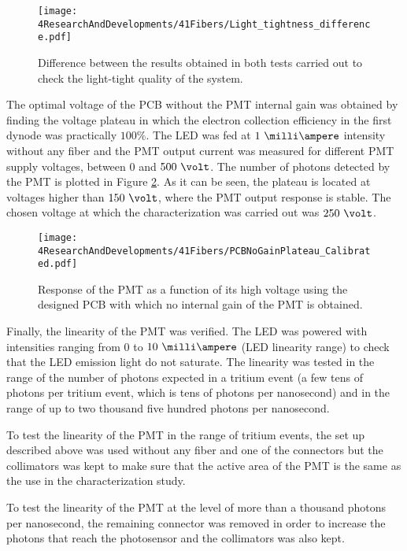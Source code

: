 \begin{figure}[h]
\centering
\texttt{[image: 4ResearchAndDevelopments/41Fibers/Light\_tightness\_difference.pdf]}
\caption{Difference between the results obtained in both tests carried out to check the light-tight quality of the system.\label{fig:LightTightnessTest}}
\end{figure}

The optimal voltage of the PCB without the PMT internal gain was obtained by finding the voltage plateau in which the electron collection efficiency in the first dynode was practically $100\%$. The LED was fed at $1~\milli\ampere$ intensity without any fiber and the PMT output current was measured for different PMT supply voltages, between $0$ and $500~\volt$. The number of photons detected by the PMT is plotted in Figure \ref{fig:PlateauNoGainPMT}. As it can be seen, the plateau is located at voltages higher than $150~\volt$, where the PMT output response is stable. The chosen voltage at which the characterization was carried out was $250~\volt$.

\begin{figure}[h]
\centering
\texttt{[image: 4ResearchAndDevelopments/41Fibers/PCBNoGainPlateau\_Calibrated.pdf]}
\caption{Response of the PMT as a function of its high voltage using the designed PCB with which no internal gain of the PMT is obtained.\label{fig:PlateauNoGainPMT}}
\end{figure}

Finally, the linearity of the PMT was verified. The LED was powered with intensities ranging from 0 to $10~\milli\ampere$ (LED linearity range) to check that the LED emission light do not saturate. The linearity was tested in the range of the number of photons expected in a tritium event (a few tens of photons per tritium event, which is tens of photons per nanosecond) and in the range of up to two thousand five hundred photons per nanosecond.

To test the linearity of the PMT in the range of tritium events, the set up described above was used without any fiber and one of the connectors but the collimators was kept to make sure that the active area of the PMT is the same as the use in the characterization study.

To test the linearity of the PMT at the level of more than a thousand photons per nanosecond, the remaining connector was removed in order to increase the photons that reach the photosensor and the collimators was also kept.

